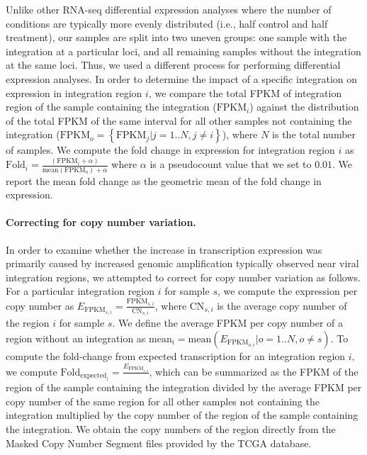 \documentclass[a4,center,fleqn]{NAR}
\begin{document}
Unlike other RNA-seq differential expression analyses where the number of conditions are typically more evenly distributed (i.e., half control and half treatment), our samples are split into two uneven groups: one sample with the integration at a particular loci, and all remaining samples without the integration at the same loci.  Thus, we used a different process for performing differential expression analyses.  In order to determine the impact of a specific integration on expression in integration region $i$, we compare the total FPKM of integration region of the sample containing the integration ($\mbox{FPKM}_i$) against the distribution of the total FPKM of the same interval for all other samples not containing the integration ($\mbox{FPKM}_{o}=\left\{\mbox{FPKM}_j|j=1..N,j\ne i\right\}$), where $N$ is the total number of samples.  We compute the fold change in expression for integration region $i$ as $\mbox{Fold}_i=\frac{(\mbox{FPKM}_i+\alpha)}{\mbox{mean}(\mbox{FPKM}_o)+\alpha}$ where $\alpha$ is a pseudocount value that we set to $0.01$.  We report the mean fold change as the geometric mean of the fold change in expression.  

\paragraph{\textbf{Correcting for copy number variation.}}
In order to examine whether the increase in transcription expression was primarily caused by increased genomic amplification typically observed near viral integration regions, we attempted to correct for copy number variation as follows.  For a particular integration region $i$ for sample $s$, we compute the expression per copy number as $E_{\mbox{FPKM}_{s,i}}=\frac{\mbox{FPKM}_{s,i}}{\mbox{CN}_{s,i}}$, where $\mbox{CN}_{s,i}$ is the average copy number of the region $i$ for sample $s$.  We define the average FPKM per copy number of a region without an integration as $\mbox{mean}_{i}=\mbox{mean}(E_{\mbox{FPKM}_{o,i}}|o=1..N,o\ne s)$.  To compute the fold-change from expected transcription for an integration region $i$, we compute $\mbox{Fold}_{\mbox{expected}_i}=\frac{E_{\mbox{FPKM}_{s,i}}}{}$, which can be summarized as the FPKM of the region of the sample containing the integration divided by the average FPKM per copy number of the same region for all other samples not containing the integration multiplied by the copy number of the region of the sample containing the integration.  We obtain the copy numbers of the region directly from the Masked Copy Number Segment files provided by the TCGA database.  
\end{document}
